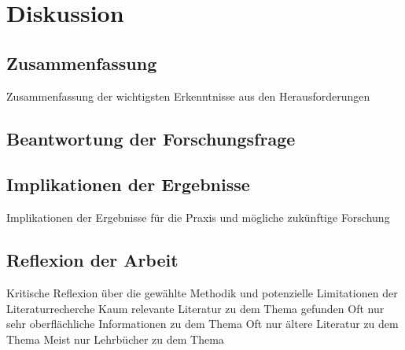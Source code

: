 \section{Diskussion}
\subsection{Zusammenfassung}
Zusammenfassung der wichtigsten Erkenntnisse aus den Herausforderungen
\subsection{Beantwortung der Forschungsfrage}

\subsection{Implikationen der Ergebnisse}
Implikationen der Ergebnisse für die Praxis und mögliche zukünftige Forschung
\subsection{Reflexion der Arbeit}
Kritische Reflexion über die gewählte Methodik und potenzielle Limitationen der Literaturrecherche
Kaum relevante Literatur zu dem Thema gefunden
Oft nur sehr oberflächliche Informationen zu dem Thema
Oft nur ältere Literatur zu dem Thema
Meist nur Lehrbücher zu dem Thema